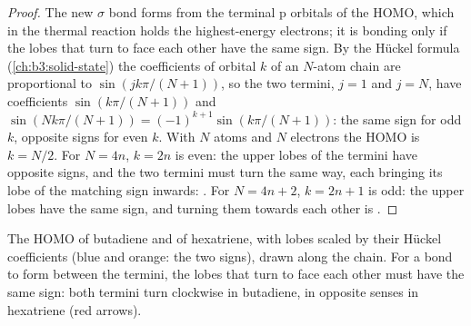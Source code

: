 \begin{proof}
The new $\sigma$ bond forms from the terminal p orbitals of the HOMO, which in the
thermal reaction holds the highest-energy electrons; it is bonding only if the
lobes that turn to face each other have the same sign. By the Hückel formula
(\cref{ch:b3:solid-state}) the coefficients of orbital $k$ of an $N$-atom chain are
proportional to $\sin(jk\pi/(N + 1))$, so the two termini, $j = 1$ and $j = N$, have
coefficients $\sin(k\pi/(N + 1))$ and $\sin(Nk\pi/(N + 1)) = (-1)^{k+1}\sin(k\pi/(N + 1))$: the same sign for odd $k$,
opposite signs for even $k$. With $N$ atoms and $N$ electrons the HOMO is
$k = N/2$. For $N = 4n$, $k = 2n$ is even: the upper lobes of the termini have opposite
signs, and the two termini must turn the same way, each bringing its lobe of
the matching sign inwards: . For $N = 4n + 2$, $k = 2n + 1$ is odd: the upper lobes
have the same sign, and turning them towards each other is .
\end{proof}

\begin{omfigure}

{\small The HOMO of butadiene and of hexatriene, with lobes scaled by their
Hückel coefficients (blue and orange: the two signs), drawn along the chain.
For a bond to form between the termini, the lobes that turn to face each other
must have the same sign: both termini turn clockwise in butadiene, in opposite
senses in hexatriene (red arrows).}
\end{omfigure}

